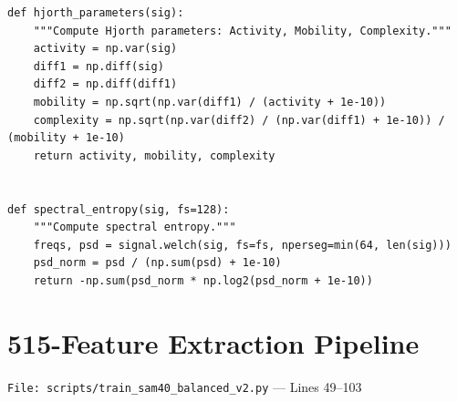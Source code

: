 \documentclass[11pt,a4paper]{article}
\begin{document}
\begin{lstlisting}[caption={Hjorth parameters and spectral entropy computation}]
def hjorth_parameters(sig):
    """Compute Hjorth parameters: Activity, Mobility, Complexity."""
    activity = np.var(sig)
    diff1 = np.diff(sig)
    diff2 = np.diff(diff1)
    mobility = np.sqrt(np.var(diff1) / (activity + 1e-10))
    complexity = np.sqrt(np.var(diff2) / (np.var(diff1) + 1e-10)) / (mobility + 1e-10)
    return activity, mobility, complexity


def spectral_entropy(sig, fs=128):
    """Compute spectral entropy."""
    freqs, psd = signal.welch(sig, fs=fs, nperseg=min(64, len(sig)))
    psd_norm = psd / (np.sum(psd) + 1e-10)
    return -np.sum(psd_norm * np.log2(psd_norm + 1e-10))
\end{lstlisting}

\section{515-Feature Extraction Pipeline}
\texttt{File: scripts/train\_sam40\_balanced\_v2.py} --- Lines 49--103
\end{document}
